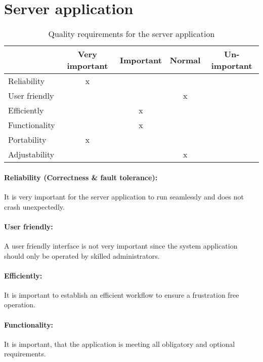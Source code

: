 \section{Server application}
\begin{table}[h]
  \begin{tabular}{| l || c | c | c | c |}
      \hline
      & Very important & Important & Normal & Un-important \\ \hline \hline
      Reliability & x & & & \\ \hline
      User friendly & & & x & \\ \hline
      Efficiently & & x & & \\ \hline
      Functionality & & x & & \\ \hline
      Portability & x & & & \\ \hline
      Adjustability & & & x & \\ \hline
  \end{tabular}
  \caption{Quality requirements for the server application}
\end{table}

\paragraph{Reliability (Correctness \& fault tolerance):}

It is very important for the server application to run seamlessly and does not crash unexpectedly.

\paragraph{User friendly:}

A user friendly interface is not very important since the system application should only be operated by skilled administrators.

\paragraph{Efficiently:}

It is important to establish an efficient workflow to ensure a frustration free operation. 

\paragraph{Functionality:}

It is important, that the application is meeting all obligatory and optional requirements.

